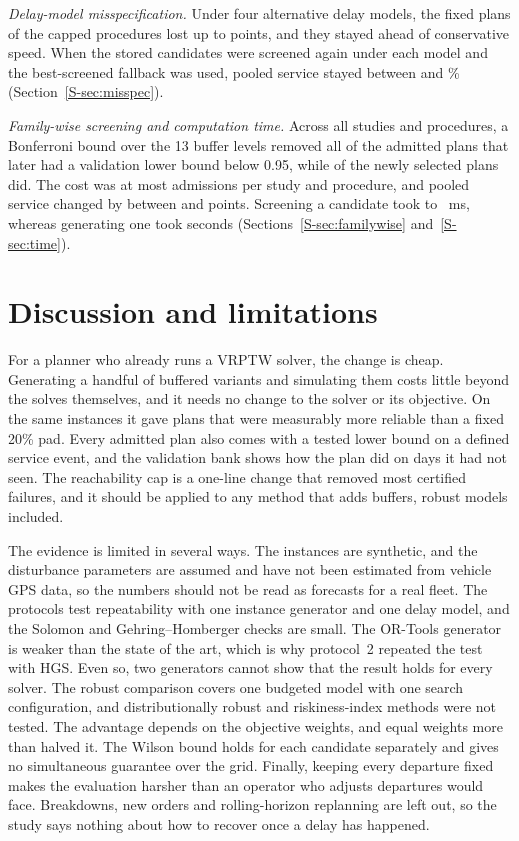 \documentclass{itor}
\newcommand{\SI}[1]{Section~\ref{S-#1}}
\begin{document}
\emph{Delay-model misspecification.} Under four alternative delay models, the
fixed plans of the capped procedures lost up to \MisCappedDrop{} points, and
they stayed ahead of conservative speed. When the stored candidates were
screened again under each model and the best-screened fallback was used, pooled
service stayed between \ResLoOrt{} and \ResHiHgs\% (\SI{sec:misspec}).

\emph{Family-wise screening and computation time.} Across all studies and
procedures, a Bonferroni bound over the 13 buffer levels removed all
\FwMissOrig{} of the \FwAdmittedOrig{} admitted plans that later had a validation
lower bound below 0.95, while \FwMissFw{} of the newly selected plans did. The cost
was at most \FwLostMax{} admissions per study and procedure, and pooled service
changed by between \FwPooledChangeMin{} and \FwPooledChangeMax{} points.
Screening a candidate took \TimeScreenTwenty{} to \TimeScreenTwoHundred{}~ms,
whereas generating one took seconds (Sections~\ref{S-sec:familywise}
and~\ref{S-sec:time}).

\section{Discussion and limitations}\label{sec:discussion}

For a planner who already runs a VRPTW solver, the change is cheap. Generating a handful of buffered variants and simulating them costs
little beyond the solves themselves, and it needs no change to the solver or its
objective. On the same instances it gave plans that were measurably more
reliable than a fixed 20\% pad. Every admitted plan also comes with a tested
lower bound on a defined service event, and the validation bank shows
how the plan did on days it had not seen. The reachability cap is a one-line
change that removed most certified failures, and it should be applied to any method
that adds buffers, robust models included.

The evidence is limited in several ways. The instances are synthetic, and the
disturbance parameters are assumed and have not been estimated from vehicle GPS
data,
so the numbers should not be read as forecasts for a real fleet. The protocols
test repeatability with one instance generator and one delay model, and the
Solomon and Gehring--Homberger checks are small. The OR-Tools generator is weaker
than the state of the art, which is why protocol~2 repeated the test with HGS. Even so,
two generators cannot show that the result holds for every solver. The robust
comparison covers one budgeted model with one search configuration, and
distributionally robust and riskiness-index methods
\citep{jaillet2016,zhang2019} were not tested. The advantage depends on the
objective weights, and equal weights more than halved it. The Wilson bound holds
for each candidate separately and gives no simultaneous guarantee over the grid.
Finally, keeping every departure fixed makes the evaluation harsher than an
operator who adjusts departures would face. Breakdowns, new orders and
rolling-horizon replanning are left out, so the study says nothing about how to
recover once a delay has happened.
\end{document}
